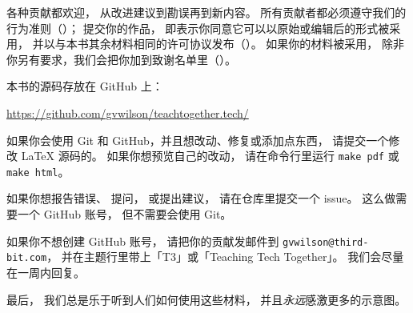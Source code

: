
各种贡献都欢迎，
从改进建议到勘误再到新内容。
所有贡献者都必须遵守我们的行为准则（）；
提交你的作品，
即表示你同意它可以以原始或编辑后的形式被采用，
并以与本书其余材料相同的许可协议发布（）。
如果你的材料被采用，
除非你另有要求，我们会把你加到致谢名单里（）。

本书的源码存放在 GitHub 上：

\begin{center}
  \url{https://github.com/gvwilson/teachtogether.tech/}
\end{center}

\noindent
如果你会使用 Git 和 GitHub，并且想改动、修复或添加点东西，
请提交一个修改 LaTeX 源码的。
如果你想预览自己的改动，
请在命令行里运行 \texttt{make~pdf} 或 \texttt{make~html}。

如果你想报告错误、
提问，
或提出建议，
请在仓库里提交一个 issue。
这么做需要一个 GitHub 账号，
但不需要会使用 Git。

如果你不想创建 GitHub 账号，
请把你的贡献发邮件到 \texttt{gvwilson@third-bit.com}，
并在主题行里带上「T3」或「Teaching Tech Together」。
我们会尽量在一周内回复。

最后，
我们总是乐于听到人们如何使用这些材料，
并且\emph{永远}感激更多的示意图。
